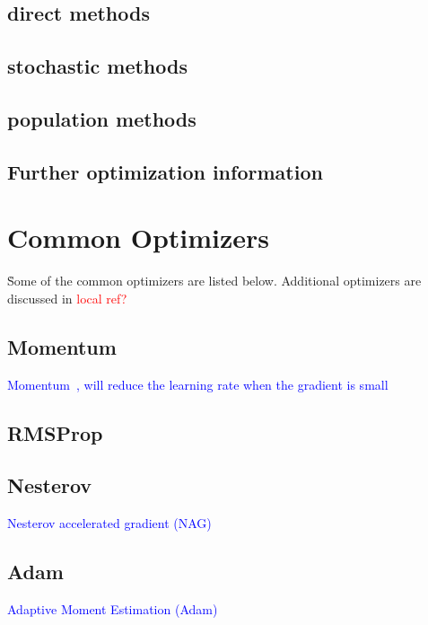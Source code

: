 \subsection{direct methods}

\subsection{stochastic methods}

\subsection{population methods}

\subsection{Further optimization information}


\section{Common Optimizers}

\r{Some of the common optimizers are listed below. Additional optimizers are discussed in \textcolor{red}{local ref?}}

\subsection{Momentum}

\textcolor{blue}{Momentum~\cite{qian1999momentum}, will reduce the learning rate when the gradient is small}

\subsection{RMSProp}

\subsection{Nesterov}

\textcolor{blue}{Nesterov accelerated gradient (NAG)}

\subsection{Adam}

\textcolor{blue}{Adaptive Moment Estimation (Adam)~\cite{kingma2014adam}}



